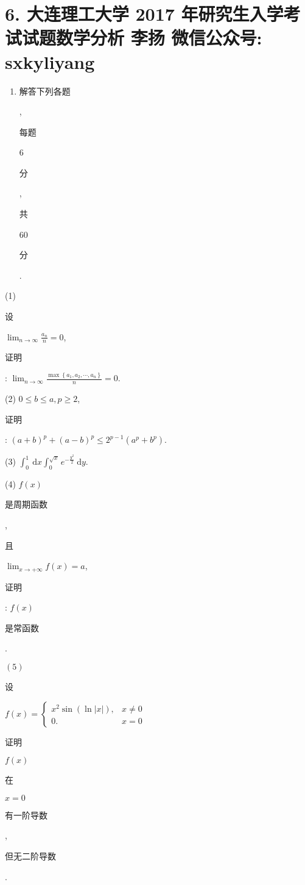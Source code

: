 \documentclass[10pt]{article}
\begin{document}
\section{6. 大连理工大学 2017 年研究生入学考试试题数学分析 
 李扬 
 微信公众号: sxkyliyang}
\begin{enumerate}
  \item \begin{CJK}{UTF8}{mj}解答下列各题\end{CJK}, \begin{CJK}{UTF8}{mj}每题\end{CJK} 6 \begin{CJK}{UTF8}{mj}分\end{CJK}, \begin{CJK}{UTF8}{mj}共\end{CJK} 60 \begin{CJK}{UTF8}{mj}分\end{CJK}.
\end{enumerate}
(1) \begin{CJK}{UTF8}{mj}设\end{CJK} $\lim _{n \rightarrow \infty} \frac{a_{n}}{n}=0$, \begin{CJK}{UTF8}{mj}证明\end{CJK}: $\lim _{n \rightarrow \infty} \frac{\max \left\{a_{1}, a_{2}, \cdots, a_{n}\right\}}{n}=0$.

(2) $0 \leqslant b \leqslant a, p \geqslant 2$, \begin{CJK}{UTF8}{mj}证明\end{CJK}: $(a+b)^{p}+(a-b)^{p} \leqslant 2^{p-1}\left(a^{p}+b^{p}\right)$.

(3) $\int_{0}^{1} \mathrm{~d} x \int_{0}^{\sqrt{x}} e^{-\frac{y^{2}}{2}} \mathrm{~d} y$.

(4) $f(x)$ \begin{CJK}{UTF8}{mj}是周期函数\end{CJK}, \begin{CJK}{UTF8}{mj}且\end{CJK} $\lim _{x \rightarrow+\infty} f(x)=a$, \begin{CJK}{UTF8}{mj}证明\end{CJK}: $f(x)$ \begin{CJK}{UTF8}{mj}是常函数\end{CJK}.

$(5)$ \begin{CJK}{UTF8}{mj}设\end{CJK} $f(x)=\left\{\begin{array}{ll}x^{2} \sin (\ln |x|), & x \neq 0 \\ 0 . & x=0\end{array}\right.$ \begin{CJK}{UTF8}{mj}证明\end{CJK} $f(x)$ \begin{CJK}{UTF8}{mj}在\end{CJK} $x=0$ \begin{CJK}{UTF8}{mj}有一阶导数\end{CJK}, \begin{CJK}{UTF8}{mj}但无二阶导数\end{CJK}.
\end{document}

